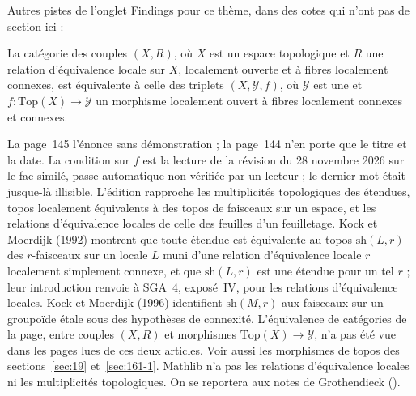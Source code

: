 \bigskip
\noindent Autres pistes de l'onglet Findings pour ce thème, dans des cotes qui n'ont pas de section ici :\par

\begin{encadre}
\begin{theoreme*}\nonverifie
La catégorie des couples $(X, R)$, où $X$ est un espace topologique et $R$ une relation d'équivalence locale sur $X$, localement ouverte et à fibres localement connexes, est équivalente à celle des triplets $(X, \mathcal Y, f)$, où $\mathcal Y$ est une  et $f : \mathrm{Top}(X) \to \mathcal Y$ un morphisme localement ouvert à fibres localement connexes et connexes.
\end{theoreme*}
\end{encadre}
{\small La page~145 l'énonce sans démonstration ; la page~144 n'en porte que le titre et la date. La condition  sur $f$ est la lecture de la révision du 28 novembre 2026 sur le fac-similé, passe automatique non vérifiée par un lecteur ; le dernier mot était jusque-là illisible. L'édition rapproche les multiplicités topologiques des étendues, topos localement équivalents à des topos de faisceaux sur un espace, et les relations d'équivalence locales de celle des feuilles d'un feuilletage. Kock et Moerdijk (1992) \cite{kockmoerdijk1992} montrent que toute étendue est équivalente au topos $\mathrm{sh}(L, r)$ des $r$-faisceaux sur un locale $L$ muni d'une relation d'équivalence locale $r$ localement simplement connexe, et que $\mathrm{sh}(L, r)$ est une étendue pour un tel $r$ ; leur introduction renvoie à SGA~4, exposé~IV, pour les relations d'équivalence locales. Kock et Moerdijk (1996) \cite{kockmoerdijk1996} identifient $\mathrm{sh}(M, r)$ aux faisceaux sur un groupoïde étale sous des hypothèses de connexité. L'équivalence de catégories de la page, entre couples $(X, R)$ et morphismes $\mathrm{Top}(X) \to \mathcal Y$, n'a pas été vue dans les pages lues de ces deux articles. Voir aussi les morphismes de topos des sections~\ref{sec:19} et~\ref{sec:161-1}. Mathlib n'a pas les relations d'équivalence locales ni les multiplicités topologiques. On se reportera aux notes de Grothendieck ().\par}
